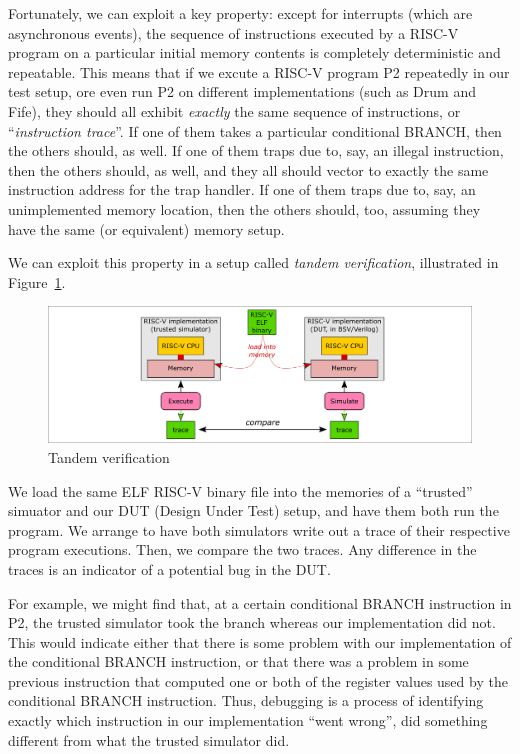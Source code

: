 Fortunately, we can exploit a key property: except for interrupts
(which are asynchronous events), the sequence of instructions executed
by a RISC-V program on a particular initial memory contents is
completely deterministic and repeatable.  This means that if we excute
a RISC-V program P2 repeatedly in our test setup, ore even run P2 on
different implementations (such as Drum and Fife), they should all
exhibit \emph{exactly} the same sequence of instructions, or
``\emph{instruction trace}''.  If one of them takes a particular
conditional BRANCH, then the others should, as well.  If one of them
traps due to, say, an illegal instruction, then the others should, as
well, and they all should vector to exactly the same instruction
address for the trap handler.  If one of them traps due to, say, an
unimplemented memory location, then the others should, too, assuming
they have the same (or equivalent) memory setup.

We can exploit this property in a setup called \emph{tandem
verification}, illustrated in Figure~\ref{Fig_tandem_verification}.
\begin{figure}[htbp]
  \centerline{\includegraphics[width=6in,angle=0]{Figures/Fig_tandem_verification}}
  \caption{\label{Fig_tandem_verification}
                  Tandem verification}
\end{figure}

We load the same ELF RISC-V binary file into the memories of a
``trusted'' simuator and our DUT (Design Under Test) setup, and have
them both run the program.  We arrange to have both simulators write
out a trace of their respective program executions.  Then, we compare
the two traces. Any difference in the traces is an indicator of a
potential bug in the DUT.

For example, we might find that, at a certain conditional BRANCH
instruction in P2, the trusted simulator took the branch whereas our
implementation did not.  This would indicate either that there is some
problem with our implementation of the conditional BRANCH instruction,
or that there was a problem in some previous instruction that computed
one or both of the register values used by the conditional BRANCH
instruction.  Thus, debugging is a process of identifying exactly
which instruction in our implementation ``went wrong'', {\ie} did
something different from what the trusted simulator did.

